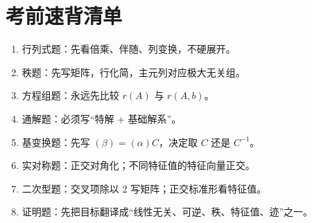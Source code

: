 ﻿\documentclass[11pt,a4paper,UTF8]{ctexart}
\begin{document}
\section{考前速背清单}
\begin{scorebox}[考前速背清单]

\begin{enumerate}
\item 行列式题：先看倍乘、伴随、列变换，不硬展开。
\item 秩题：先写矩阵，行化简，主元列对应极大无关组。
\item 方程组题：永远先比较 $r(A)$ 与 $r(A,b)$。
\item 通解题：必须写“特解 + 基础解系”。
\item 基变换题：先写 $(\beta)=(\alpha)C$，决定取 $C$ 还是 $C^{-1}$。
\item 实对称题：正交对角化；不同特征值的特征向量正交。
\item 二次型题：交叉项除以 $2$ 写矩阵；正交标准形看特征值。
\item 证明题：先把目标翻译成“线性无关、可逆、秩、特征值、迹”之一。
\end{enumerate}
\end{scorebox}
\end{document}
